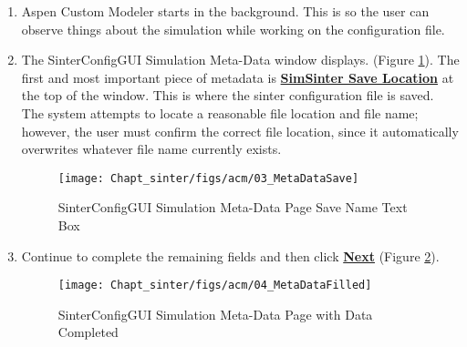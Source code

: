 \begin{enumerate}
\item Aspen Custom Modeler starts in the background. This is so the user can observe things about the simulation while working on the configuration file.

\item	The SinterConfigGUI Simulation Meta-Data window displays. (Figure \ref{fig.sinter.acm.savename}). The
  first and most important piece of metadata is \textbf{\underline{SimSinter Save Location}} at
  the top of the window. This is where the sinter configuration file is saved. 
  The system attempts to locate a reasonable file location and file name; however, the user must confirm the correct file location, since it automatically overwrites whatever file name currently exists.
\begin{figure}[H]
	\begin{center}
		\texttt{[image: Chapt\_sinter/figs/acm/03\_MetaDataSave]}
		\caption{SinterConfigGUI Simulation Meta-Data Page Save Name Text Box}
		\label{fig.sinter.acm.savename}
	\end{center}
\end{figure}

\item Continue to complete the remaining fields and then click
  \textbf{\underline{Next}} (Figure \ref{fig.sinter.acm.metadata}).
\begin{figure}[H]
	\begin{center}
		\texttt{[image: Chapt\_sinter/figs/acm/04\_MetaDataFilled]}
		\caption{SinterConfigGUI Simulation Meta-Data Page with Data Completed}
		\label{fig.sinter.acm.metadata}
	\end{center}
\end{figure}


\end{enumerate}
